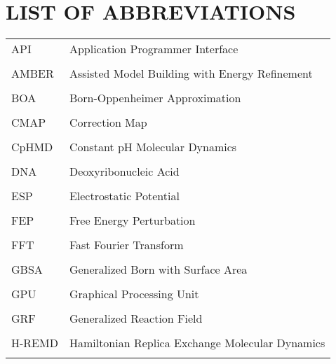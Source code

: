 
\chapter*{LIST OF ABBREVIATIONS}

\singlespacing

\begin{tabular}{lp{5in}}

API & Application Programmer Interface \\ \\

AMBER & Assisted Model Building with Energy Refinement \\ \\

BOA & Born-Oppenheimer Approximation \\ \\

CMAP & Correction Map \\ \\ 

CpHMD & Constant pH Molecular Dynamics \\ \\

DNA & Deoxyribonucleic Acid \\ \\

ESP & Electrostatic Potential \\ \\

FEP & Free Energy Perturbation \\ \\

FFT & Fast Fourier Transform \\ \\

GBSA & Generalized Born with Surface Area \\ \\

GPU & Graphical Processing Unit \\ \\

GRF & Generalized Reaction Field \\ \\

H-REMD & Hamiltonian Replica Exchange Molecular Dynamics \\ \\


\end{tabular}
